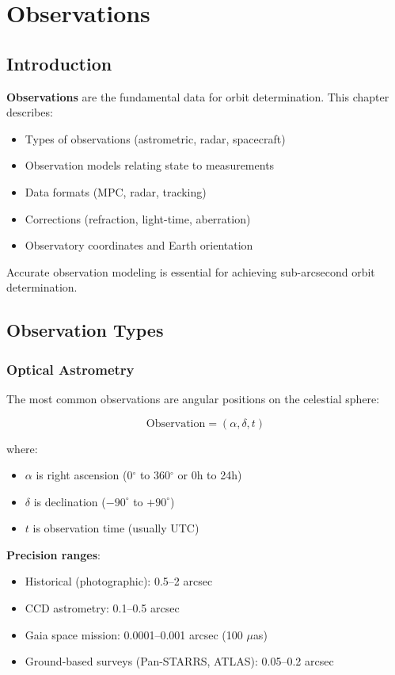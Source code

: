 \chapter{Observations}
\label{ch:observations}

\section{Introduction}

\textbf{Observations} are the fundamental data for orbit determination. This chapter describes:
\begin{itemize}
    \item Types of observations (astrometric, radar, spacecraft)
    \item Observation models relating state to measurements
    \item Data formats (MPC, radar, tracking)
    \item Corrections (refraction, light-time, aberration)
    \item Observatory coordinates and Earth orientation
\end{itemize}

Accurate observation modeling is essential for achieving sub-arcsecond orbit determination.

\section{Observation Types}

\subsection{Optical Astrometry}

The most common observations are angular positions on the celestial sphere:

\begin{equation}
    \text{Observation} = (\alpha, \delta, t)
\end{equation}

where:
\begin{itemize}
    \item $\alpha$ is right ascension (0$^\circ$ to 360$^\circ$ or 0h to 24h)
    \item $\delta$ is declination ($-90^\circ$ to $+90^\circ$)
    \item $t$ is observation time (usually UTC)
\end{itemize}

\textbf{Precision ranges}:
\begin{itemize}
    \item Historical (photographic): 0.5--2 arcsec
    \item CCD astrometry: 0.1--0.5 arcsec
    \item Gaia space mission: 0.0001--0.001 arcsec (100 $\mu$as)
    \item Ground-based surveys (Pan-STARRS, ATLAS): 0.05--0.2 arcsec
\end{itemize}

